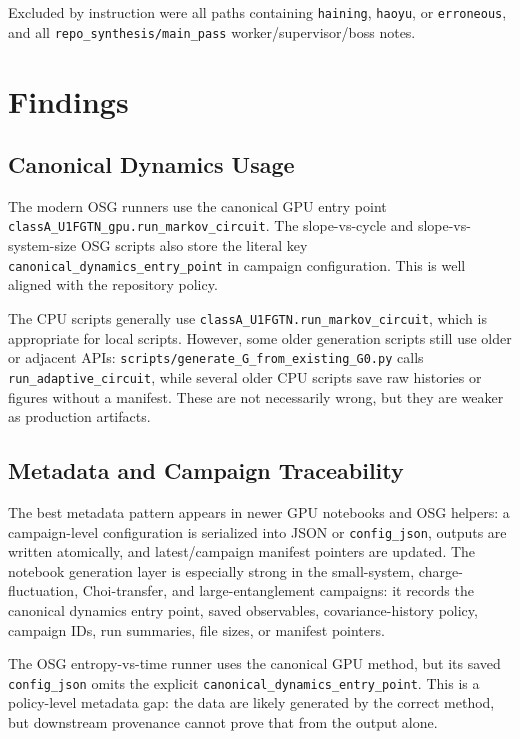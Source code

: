 \documentclass[aps,prb,onecolumn,nofootinbib,superscriptaddress]{revtex4-2}
\begin{document}
Excluded by instruction were all paths containing \texttt{haining},
\texttt{haoyu}, or \texttt{erroneous}, and all
\texttt{repo\_synthesis/main\_pass} worker/supervisor/boss notes.

\section{Findings}

\subsection{Canonical Dynamics Usage}

The modern OSG runners use the canonical GPU entry point
\texttt{classA\_U1FGTN\_gpu.run\_markov\_circuit}.  The slope-vs-cycle and
slope-vs-system-size OSG scripts also store the literal key
\texttt{canonical\_dynamics\_entry\_point} in campaign configuration.  This is
well aligned with the repository policy.

The CPU scripts generally use \texttt{classA\_U1FGTN.run\_markov\_circuit}, which
is appropriate for local scripts.  However, some older generation scripts still
use older or adjacent APIs: \texttt{scripts/generate\_G\_from\_existing\_G0.py}
calls \texttt{run\_adaptive\_circuit}, while several older CPU scripts save raw
histories or figures without a manifest.  These are not necessarily wrong, but
they are weaker as production artifacts.

\subsection{Metadata and Campaign Traceability}

The best metadata pattern appears in newer GPU notebooks and OSG helpers: a
campaign-level configuration is serialized into JSON or \texttt{config\_json},
outputs are written atomically, and latest/campaign manifest pointers are
updated.  The notebook generation layer is especially strong in the small-system,
charge-fluctuation, Choi-transfer, and large-entanglement campaigns: it records
the canonical dynamics entry point, saved observables, covariance-history policy,
campaign IDs, run summaries, file sizes, or manifest pointers.

The OSG entropy-vs-time runner uses the canonical GPU method, but its saved
\texttt{config\_json} omits the explicit
\texttt{canonical\_dynamics\_entry\_point}.  This is a policy-level metadata gap:
the data are likely generated by the correct method, but downstream provenance
cannot prove that from the output alone.
\end{document}
